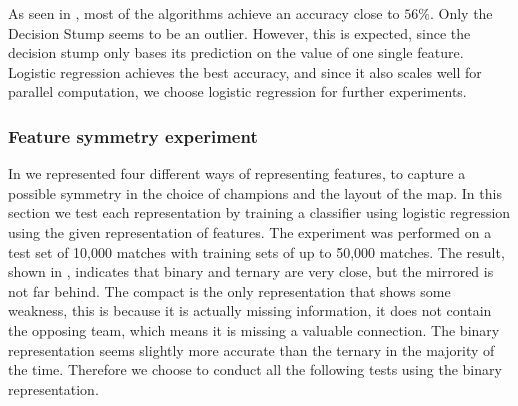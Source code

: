 As seen in , most of the algorithms achieve an accuracy close to $56 \%$. Only the Decision Stump seems to be an outlier. However, this is expected, since the decision stump only bases its prediction on the value of one single feature.
Logistic regression achieves the best accuracy, and since it also scales well for parallel computation, we choose logistic regression for further experiments.

\subsubsection{Feature symmetry experiment}
In  we represented four different ways of representing features, to capture a possible symmetry in the choice of champions and the layout of the map. In this section we test each representation by training a classifier using logistic regression using the given representation of features. The experiment was performed on a test set of 10,000 matches with training sets of up to 50,000 matches. The result, shown in , indicates that binary and ternary are very close, but the mirrored is not far behind. The compact is the only representation that shows some weakness, this is because it is actually missing information, it does not contain the opposing team, which means it is missing a valuable connection. The binary representation seems slightly more accurate than the ternary in the majority of the time. Therefore we choose to conduct all the following tests using the binary representation. 

